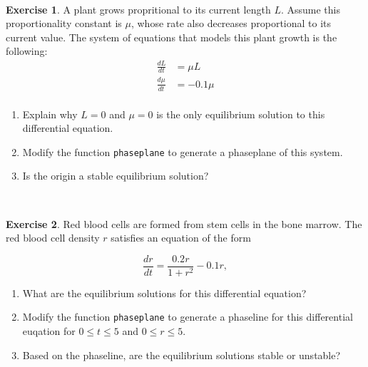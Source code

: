 \documentclass[
]{book}
\theoremstyle{definition}
\theoremstyle{definition}
\theoremstyle{definition}
\newtheorem{exercise}{Exercise}[chapter]
\theoremstyle{remark}
\begin{document}
~

\begin{exercise}
\protect\hypertarget{exr:unnamed-chunk-105}{}{\label{exr:unnamed-chunk-105} }A plant grows propritional to its current length \(L\). Assume this proportionality constant is \(\mu\), whose rate also decreases proportional to its current value. The system of equations that models this plant growth is the following:
\begin{equation}
\begin{split}
\frac{dL}{dt} &= \mu L \\ 
\frac{d\mu}{dt}  &= -0.1 \mu \\
\end{split}
\end{equation}

\begin{enumerate}[label=\alph*.]
 \item Explain why $L=0$ and $\mu=0$ is the only equilibrium solution to this differential equation.
\item Modify the function \texttt{phaseplane} to generate a phaseplane of this system.
\item Is the origin a stable equilibrium solution?
\end{enumerate}
\end{exercise}

~

\begin{exercise}
\protect\hypertarget{exr:unnamed-chunk-106}{}{\label{exr:unnamed-chunk-106} }Red blood cells are formed from stem cells in the bone marrow. The red blood cell density \(r\) satisfies an equation of the form

\begin{equation}
\frac{dr}{dt} = \frac{0.2r}{1+r^{2}} -  0.1 r,
\end{equation}

\begin{enumerate}[label=\alph*.]
 \item What are the equilibrium solutions for this differential equation?
\item Modify the function \texttt{phaseplane} to generate a phaseline for this differential euqation for $0 \leq t \leq 5$ and $0 \leq r \leq 5$.
\item Based on the phaseline, are the equilibrium solutions stable or unstable?
\end{enumerate}
\end{exercise}

~
\end{document}
